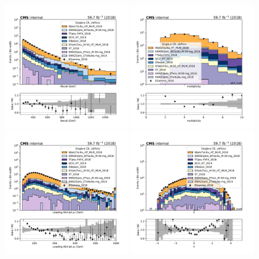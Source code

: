 {\begin{figure}[htbp]
    \begin{center}
        \includegraphics[width=0.49\textwidth]{fig/datamc/cr_1e_vbf/cr_1e_vbf_recoil_losf_2018.pdf}
        \includegraphics[width=0.49\textwidth]{fig/datamc/cr_1e_vbf/cr_1e_vbf_ak4_mult_losf_2018.pdf} \\
        \includegraphics[width=0.49\textwidth]{fig/datamc/cr_1e_vbf/cr_1e_vbf_ak4_pt0_losf_2018.pdf}
        \includegraphics[width=0.49\textwidth]{fig/datamc/cr_1e_vbf/cr_1e_vbf_ak4_eta0_losf_2018.pdf}

\end{center}
\end{figure}}
